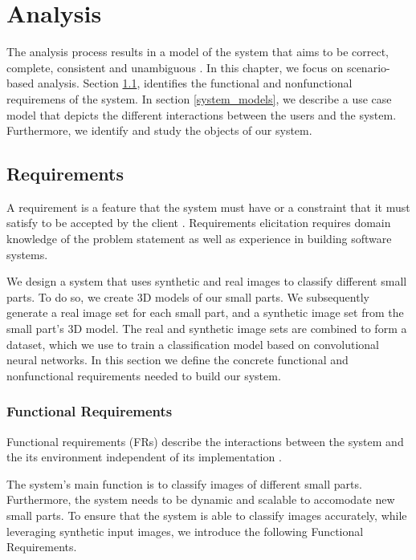 \chapter{Analysis}\label{ch:analysis}

The analysis process results in a model of the system that aims to be correct, complete, consistent and unambiguous \cite{bruegge2004object}. In this chapter, we focus on scenario-based analysis. Section \ref{requirements}, identifies the functional and nonfunctional requiremens of the system. In section \ref{system_models}, we describe a use case model that depicts the different interactions between the users and the system. Furthermore, we identify and study the objects of our system.


\section{Requirements}\label{requirements}

A requirement is a feature that the system must have or a constraint that it must satisfy to be accepted by the client \cite{bruegge2004object}. Requirements elicitation requires domain knowledge of the problem statement as well as experience in building software systems.

We design a system that uses synthetic and real images to classify different small parts. To do so, we create 3D models of our small parts. We subsequently generate a real image set for each small part, and a synthetic image set from the small part's 3D model. The real and synthetic image sets are combined to form a dataset, which we use to train a classification model based on convolutional neural networks. In this section we define the concrete functional and nonfunctional requirements needed to build our system.

\subsection{Functional Requirements}
Functional requirements (FRs) describe the interactions between the system and the its environment independent of its implementation \cite{bruegge2004object}.

The system's main function is to classify images of different small parts. Furthermore, the system needs to be dynamic and scalable to accomodate new small parts. To ensure that the system is able to classify images accurately, while leveraging synthetic input images, we introduce the following Functional Requirements.

